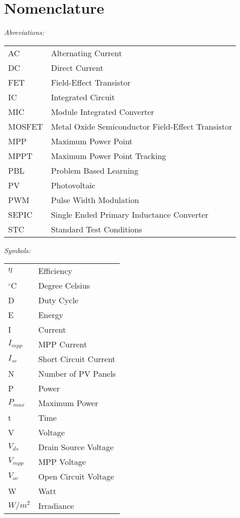 \chapter*{Nomenclature}

\vspace{-10mm} %
\textit{Abreviations:}\newline
\begin{tabular}{ll} %
AC & Alternating Current\\
DC & Direct Current\\
FET & Field-Effect Transistor\\
IC & Integrated Circuit\\
MIC & Module Integrated Converter\\
MOSFET & Metal Oxide Semiconductor Field-Effect Transistor\\
MPP & Maximum Power Point\\
MPPT & Maximum Power Point Tracking\\
PBL & Problem Based Learning\\
PV & Photovoltaic\\
PWM & Pulse Width Modulation\\
SEPIC & Single Ended Primary Inductance Converter\\
STC & Standard Test Conditions\\
\end{tabular}

\vspace{5mm} %

\noindent\textit{Symbols:}\newline
\begin{tabular}{ll}
$\eta$ & Efficiency\\
$^\circ$C & Degree Celsius\\
D & Duty Cycle\\
E & Energy\\
I & Current\\
$I_{mpp}$ & MPP Current\\
$I_{sc}$ & Short Circuit Current\\
N & Number of PV Panels \\
P & Power\\
$P_{max}$ & Maximum Power\\
t & Time\\
V & Voltage\\
$V_{ds}$ & Drain Source Voltage\\
$V_{mpp}$ & MPP Voltage\\
$V_{oc}$ & Open Circuit Voltage\\
W & Watt\\
$W/m^2$ & Irradiance\\
\end{tabular}